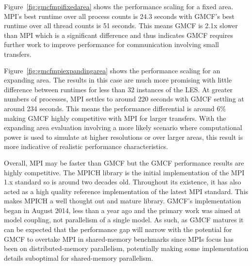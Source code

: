 Figure~\ref{fig:gmcfmpifixedarea} shows the performance scaling for a fixed
area. MPI's best runtime over all process counts is 24.3 seconds with GMCF's
best runtime over all thread counts is 51 seconds. This means GMCF is 2.1x
slower than MPI which is a significant difference and thus indicates GMCF
requires further work to improve performance for communication involving small
transfers.

Figure~\ref{fig:gmcfmpiexpandingarea} shows the performance scaling for an
expanding area. The results in this case are much more promising with little
difference between runtimes for less than 32 instances of the LES. At greater
numbers of processes, MPI settles to around 220 seconds with GMCF settling at
around 234 seconds. This means the performance differential is around 6\% making
GMCF highly competitive with MPI for larger transfers. With the expanding area
evaluation involving a more likely scenario where computational power is used to
simulate at higher resolutions or over larger areas, this result is more
indicative of realistic performance characteristics.

Overall, MPI may be faster than GMCF but the GMCF performance results are highly
competitive. The MPICH library is the initial implementation of the MPI 1.x
standard so is around two decades old. Throughout its existence, it has also
acted as a high quality reference implementation of the latest MPI standard.
This makes MPICH a well thought out and mature library. GMCF's implementation
began in August 2014, less than a year ago and the primary work was aimed at
model coupling, not parallelism of a single model. As such, as GMCF matures it
can be expected that the performance gap will narrow with the potential for GMCF
to overtake MPI in shared-memory benchmarks since MPIs focus has been on
distributed-memory parallelism, potentially making some implementation details
suboptimal for shared-memory parallelism.
